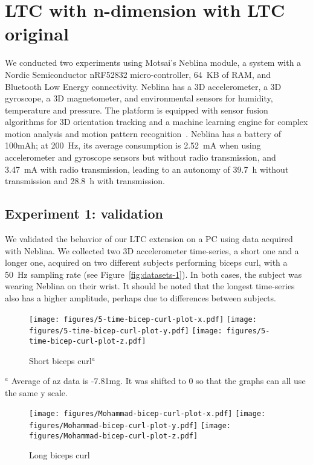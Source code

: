 \section{LTC with n-dimension with LTC original}
We conducted two experiments using Motsai's Neblina 
module, a system 
with a Nordic Semiconductor nRF52832 micro-controller, 64~KB of RAM, 
and Bluetooth Low Energy connectivity. Neblina has a 3D 
accelerometer, a 3D gyroscope, a 3D magnetometer, and environmental 
sensors for humidity, temperature and pressure. The platform is 
equipped with sensor fusion algorithms for 3D orientation tracking and 
a machine learning engine for complex motion analysis and motion 
pattern recognition~\cite{sarbishei2016accuracy}. Neblina has a 
battery of 100mAh; at 200~Hz, its average consumption is 2.52~mA when using 
accelerometer and gyroscope sensors but without radio 
transmission, and 3.47~mA with radio transmission, leading to an 
autonomy of 39.7~h without transmission and 28.8~h with transmission. 

\subsection{Experiment 1: validation}

We validated the behavior of our LTC extension on a PC using data 
acquired with Neblina. We collected two 3D accelerometer time-series, a 
short one and a longer one, acquired on two different subjects 
performing biceps curl, with a 50~Hz sampling rate (see 
Figure~\ref{fig:datasets-1}). In both cases, the subject was wearing 
Neblina on their wrist. It should be noted that the longest
time-series also has a higher amplitude, perhaps due to differences between 
subjects.

\begin{figure*}
\centering
\begin{subfigure}{\columnwidth}
\centering
\texttt{[image: figures/5-time-bicep-curl-plot-x.pdf]}
\texttt{[image: figures/5-time-bicep-curl-plot-y.pdf]}
\texttt{[image: figures/5-time-bicep-curl-plot-z.pdf]}
\caption{Short biceps curl$^a$}
\end{subfigure}

{\footnotesize $^a$ Average 
of az data is -7.81mg. It was shifted to 0 so that the graphs can all 
use the same y scale.}

\begin{subfigure}{\columnwidth}
\centering
\texttt{[image: figures/Mohammad-bicep-curl-plot-x.pdf]}
\texttt{[image: figures/Mohammad-bicep-curl-plot-y.pdf]}
\texttt{[image: figures/Mohammad-bicep-curl-plot-z.pdf]}
\caption{Long biceps curl}
\end{subfigure}

\caption{Time-series used in Experiment 1}
\label{fig:datasets-1}
\end{figure*}

